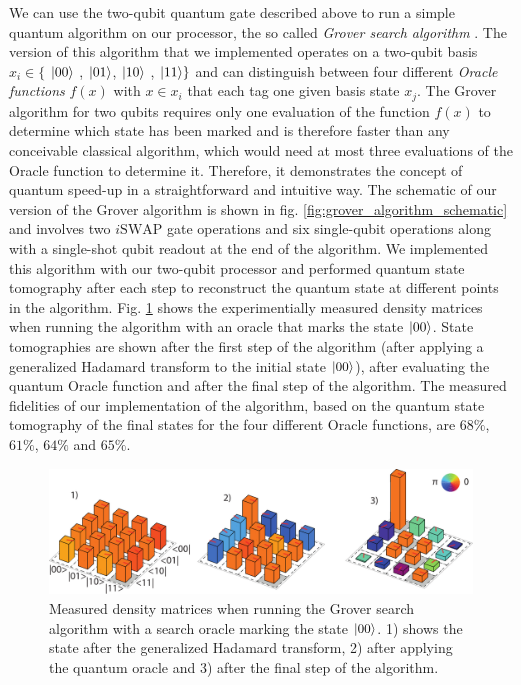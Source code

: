 We can use the two-qubit quantum gate described above to run a simple quantum algorithm on our processor, the so called {\it Grover search algorithm} \citep{Grover_Quantum_1997}. The version of this algorithm that we implemented operates on a two-qubit basis $x_i \in \{$ $\left| 00 \right>$ , $\left| 01 \right>$, $\left| 10 \right>$ , $\left| 11 \right>\}$ and can distinguish between four different {\it Oracle functions} $f(x)$ with $x \in x_i$ that each tag one given basis state $x_j$. The Grover algorithm for two qubits requires only one evaluation of the function $f(x)$ to determine which state has been marked and is therefore faster than any conceivable classical algorithm, which would need at most three evaluations of the Oracle function to determine it. Therefore, it demonstrates the concept of quantum speed-up in a straightforward and intuitive way. The schematic of our version of the Grover algorithm is shown in fig. \ref{fig:grover_algorithm_schematic} and involves two $i\mathrm{SWAP}$ gate operations and six single-qubit operations along with a single-shot qubit readout at the end of the algorithm. We implemented this algorithm with our two-qubit processor and performed quantum state tomography after each step to reconstruct the quantum state at different points in the algorithm. Fig. \ref{fig:grover_density_matrices_state_1} shows the experimentially measured density matrices when running the algorithm with an oracle that marks the state $\left| 00 \right>$. State tomographies are shown after the first step of the algorithm (after applying a generalized Hadamard transform to the initial state $\left| 00 \right>$), after evaluating the quantum Oracle function and after the final step of the algorithm. The measured fidelities of our implementation of the algorithm, based on the quantum state tomography of the final states for the four different Oracle functions, are $68 \%$, $61 \%$, $64 \%$ and $65 \%$. 

\begin{figure}[ht!]
	\centering
		\includegraphics[width=1.\textwidth]{./material/figures/2-qubit-processor/grover/grover-density-matrices-state-1}
	\caption[Measured density matrices when running the Grover algorithm]{Measured density matrices when running the Grover search algorithm with a search oracle marking the state $\left| 00 \right>$. 1) shows the state after the generalized Hadamard transform, 2) after applying the quantum oracle and 3) after the final step of the algorithm.} 
	\label{fig:grover_density_matrices_state_1}
\end{figure}


